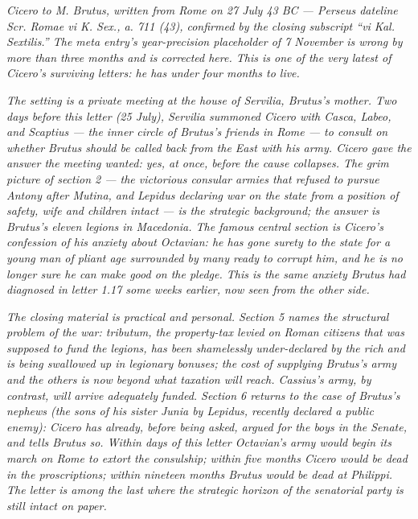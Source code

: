 
\textit{Cicero to M. Brutus, written from Rome on
27 July 43 BC --- Perseus dateline \textit{Scr. Romae vi
K. Sex., a. 711 (43)}, confirmed by the closing subscript
``\textit{vi Kal. Sextilis}.'' The meta entry's
year-precision placeholder of 7 November is wrong by
more than three months and is corrected here. This is one
of the very latest of Cicero's surviving letters: he has
under four months to live.}

\textit{The setting is a private meeting at the house of
Servilia, Brutus's mother. Two days before this letter
(25 July), Servilia summoned Cicero with Casca, Labeo,
and Scaptius --- the inner circle of Brutus's friends in
Rome --- to consult on whether Brutus should be called
back from the East with his army. Cicero gave the answer
the meeting wanted: yes, at once, before the cause
collapses. The grim picture of section 2 --- the
victorious consular armies that refused to pursue
Antony after Mutina, and Lepidus declaring war on the
state from a position of safety, wife and children
intact --- is the strategic background; the answer is
Brutus's eleven legions in Macedonia. The famous central
section is Cicero's confession of his anxiety about
Octavian: he has gone surety to the state for a young man
of pliant age surrounded by many ready to corrupt him,
and he is no longer sure he can make good on the pledge.
This is the same anxiety Brutus had diagnosed in letter
1.17 some weeks earlier, now seen from the other side.}

\textit{The closing material is practical and personal.
Section 5 names the structural problem of the war:
\textit{tributum}, the property-tax levied on Roman
citizens that was supposed to fund the legions, has been
shamelessly under-declared by the rich and is being
swallowed up in legionary bonuses; the cost of supplying
Brutus's army and the others is now beyond what taxation
will reach. Cassius's army, by contrast, will arrive
adequately funded. Section 6 returns to the case of
Brutus's nephews (the sons of his sister Junia by
Lepidus, recently declared a public enemy): Cicero has
already, before being asked, argued for the boys in the
Senate, and tells Brutus so. Within days of this letter
Octavian's army would begin its march on Rome to extort
the consulship; within five months Cicero would be dead
in the proscriptions; within nineteen months Brutus would
be dead at Philippi. The letter is among the last where
the strategic horizon of the senatorial party is still
intact on paper.}

